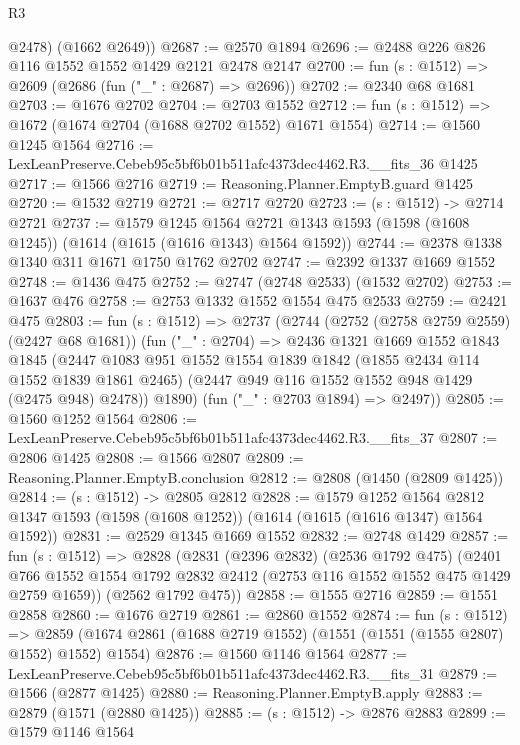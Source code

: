 \begin{lexlean}{R3}
\begin{coremodule}
        @2478)
      (@1662 @2649))
@2687 := @2570 @1894
@2696 := @2488 @226 @826 @116 @1552 @1552 @1429 @2121 @2478 @2147
@2700 := fun (s : @1512) => @2609 (@2686 (fun ("_" : @2687) => @2696))
@2702 := @2340 @68 @1681
@2703 := @1676 @2702
@2704 := @2703 @1552
@2712 := fun (s : @1512) => @1672 (@1674 @2704 (@1688 @2702 @1552) @1671 @1554)
@2714 := @1560 @1245 @1564
@2716 := LexLeanPreserve.Cebeb95c5bf6b01b511afc4373dec4462.R3.__fits_36 @1425
@2717 := @1566 @2716
@2719 := Reasoning.Planner.EmptyB.guard @1425
@2720 := @1532 @2719
@2721 := @2717 @2720
@2723 := (s : @1512) -> @2714 @2721
@2737 := @1579
    @1245
    @1564
    @2721
    @1343
    @1593
    (@1598 (@1608 @1245))
    (@1614 (@1615 (@1616 @1343) @1564 @1592))
@2744 := @2378 @1338 @1340 @311 @1671 @1750 @1762 @2702
@2747 := @2392 @1337 @1669 @1552
@2748 := @1436 @475
@2752 := @2747 (@2748 @2533) (@1532 @2702)
@2753 := @1637 @476
@2758 := @2753 @1332 @1552 @1554 @475 @2533
@2759 := @2421 @475
@2803 := fun (s : @1512) =>
  @2737
    (@2744
      (@2752 (@2758 @2759 @2559) (@2427 @68 @1681))
      (fun ("_" : @2704) =>
      @2436
        @1321
        @1669
        @1552
        @1843
        @1845
        (@2447
          @1083
          @951
          @1552
          @1554
          @1839
          @1842
          (@1855 @2434 @114 @1552 @1839 @1861 @2465)
          (@2447 @949 @116 @1552 @1552 @948 @1429 (@2475 @948) @2478))
        @1890)
      (fun ("_" : @2703 @1894) => @2497))
@2805 := @1560 @1252 @1564
@2806 := LexLeanPreserve.Cebeb95c5bf6b01b511afc4373dec4462.R3.__fits_37
@2807 := @2806 @1425
@2808 := @1566 @2807
@2809 := Reasoning.Planner.EmptyB.conclusion
@2812 := @2808 (@1450 (@2809 @1425))
@2814 := (s : @1512) -> @2805 @2812
@2828 := @1579
    @1252
    @1564
    @2812
    @1347
    @1593
    (@1598 (@1608 @1252))
    (@1614 (@1615 (@1616 @1347) @1564 @1592))
@2831 := @2529 @1345 @1669 @1552
@2832 := @2748 @1429
@2857 := fun (s : @1512) =>
  @2828
    (@2831
      (@2396 @2832)
      (@2536 @1792 @475)
      (@2401 @766 @1552 @1554 @1792 @2832 @2412 (@2753 @116 @1552 @1552 @475 @1429 @2759 @1659))
      (@2562 @1792 @475))
@2858 := @1555 @2716
@2859 := @1551 @2858
@2860 := @1676 @2719
@2861 := @2860 @1552
@2874 := fun (s : @1512) =>
  @2859 (@1674 @2861 (@1688 @2719 @1552) (@1551 (@1551 (@1555 @2807) @1552) @1552) @1554)
@2876 := @1560 @1146 @1564
@2877 := LexLeanPreserve.Cebeb95c5bf6b01b511afc4373dec4462.R3.__fits_31
@2879 := @1566 (@2877 @1425)
@2880 := Reasoning.Planner.EmptyB.apply
@2883 := @2879 (@1571 (@2880 @1425))
@2885 := (s : @1512) -> @2876 @2883
@2899 := @1579
    @1146
    @1564

\end{coremodule}
\end{lexlean}
